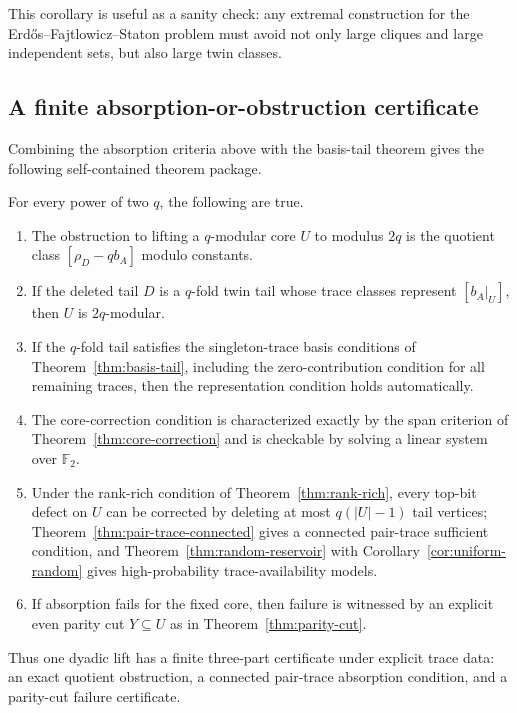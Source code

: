 \documentclass[thmsec,dntnbr,nolinenbrs]{dmgt}
\numberwithin{equation}{section}
\newcommand{\F}{\mathbb{F}}
\begin{document}
This corollary is useful as a sanity check: any extremal construction for the Erd\H{o}s--Fajtlowicz--Staton problem must avoid not only large cliques and large independent sets, but also large twin classes.

\subsection{A finite absorption-or-obstruction certificate}

Combining the absorption criteria above with the basis-tail theorem gives the following self-contained theorem package.

\begin{theorem}\label{thm:package}
For every power of two \(q\), the following are true.
\begin{enumerate}[label=\textup{(\arabic*)}, leftmargin=*]
    \item The obstruction to lifting a \(q\)-modular core \(U\) to modulus \(2q\) is the quotient class \([\rho_D-qb_A]\) modulo constants.
    \item If the deleted tail \(D\) is a \(q\)-fold twin tail whose trace classes represent \([b_A|_U]\), then \(U\) is \(2q\)-modular.
    \item If the \(q\)-fold tail satisfies the singleton-trace basis conditions of Theorem~\ref{thm:basis-tail}, including the zero-contribution condition for all remaining traces, then the representation condition holds automatically.
    \item The core-correction condition is characterized exactly by the span criterion of Theorem~\ref{thm:core-correction} and is checkable by solving a linear system over \(\F_2\).
    \item Under the rank-rich condition of Theorem~\ref{thm:rank-rich}, every top-bit defect on \(U\) can be corrected by deleting at most \(q(|U|-1)\) tail vertices; Theorem~\ref{thm:pair-trace-connected} gives a connected pair-trace sufficient condition, and Theorem~\ref{thm:random-reservoir} with Corollary~\ref{cor:uniform-random} gives high-probability trace-availability models.
    \item If absorption fails for the fixed core, then failure is witnessed by an explicit even parity cut \(Y\subseteq U\) as in Theorem~\ref{thm:parity-cut}.
\end{enumerate}
Thus one dyadic lift has a finite three-part certificate under explicit trace data: an exact quotient obstruction, a connected pair-trace absorption condition, and a parity-cut failure certificate.
\end{theorem}
\end{document}
